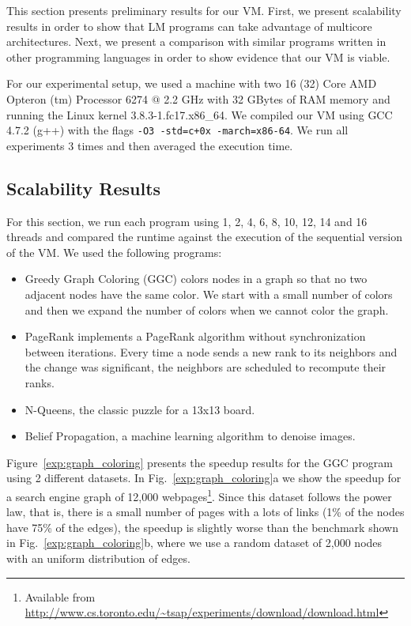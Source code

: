 This section presents preliminary results for our VM.
First, we present scalability results in order to show that LM programs can take advantage of multicore architectures.
Next, we present a comparison with similar programs written in other programming languages
in order to show evidence that our VM is viable.

For our experimental setup, we used a machine 
with two 16 (32) Core AMD Opteron
(tm) Processor 6274 $@$ 2.2 GHz with 32 GBytes of RAM memory and running the Linux
kernel 3.8.3-1.fc17.x86\_64.
     We compiled our VM using GCC 4.7.2 (g++) with the flags \texttt{-O3 -std=c+0x -march=x86-64}.
     We run all experiments 3 times and then averaged the execution time.
     
\subsection{Scalability Results}

For this section, we run each program using 1, 2, 4, 6, 8, 10, 12, 14 and 16 threads and compared the runtime against the execution of the sequential version of the VM. We used the following programs:

\newcommand{\figsize}[0]{6.5cm}
\captionsetup[sub]{              %
       font=scriptsize}

\begin{itemize}
   \item Greedy Graph Coloring (GGC) colors nodes in a graph so that no two adjacent nodes have the same color. We start with a small number of colors and then we expand the number of colors when we cannot color the graph.
   \item PageRank implements a PageRank algorithm without synchronization between iterations. Every time a node sends a new rank to its neighbors and the change was significant, the neighbors are scheduled to recompute their ranks.
   \item N-Queens, the classic puzzle for a 13x13 board.
   \item Belief Propagation, a machine learning algorithm to denoise images.
\end{itemize}

Figure~\ref{exp:graph_coloring} presents the speedup results for the GGC program using 2 different datasets. In Fig.~\ref{exp:graph_coloring}a we show the speedup for a search engine graph of 12,000 webpages\footnote{Available from \url{http://www.cs.toronto.edu/~tsap/experiments/download/download.html}}. Since this dataset follows the power law, that is, there is a small number of pages with a lots of links (1\% of the nodes have 75\% of the edges), the speedup is slightly worse than the benchmark shown in Fig.~\ref{exp:graph_coloring}b, where we use a random dataset of 2,000 nodes with an uniform distribution of edges.

